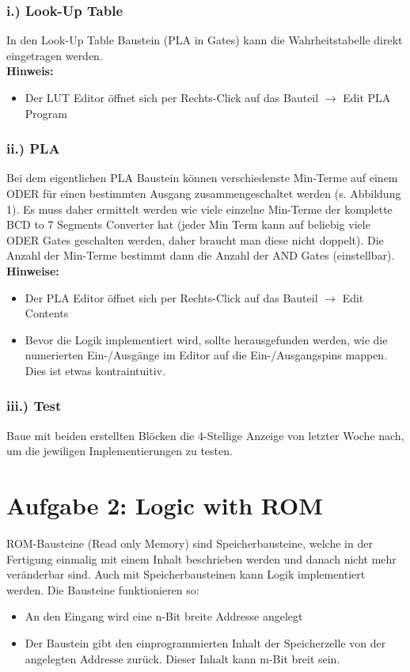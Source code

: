 \documentclass[a4paper]{scrartcl}
\begin{document}
\subsubsection*{i.) Look-Up Table}
In den Look-Up Table Baustein (PLA in Gates)  kann die Wahrheitstabelle direkt eingetragen werden.\\

\textbf{Hinweis:}
\begin{itemize}
  \item Der LUT Editor öffnet sich per Rechts-Click auf das Bauteil $\rightarrow$ Edit PLA Program
\end{itemize}

\subsubsection*{ii.) PLA}
Bei dem eigentlichen PLA Baustein können verschiedenste Min-Terme auf einem ODER für einen bestimmten Ausgang zusammengeschaltet werden (s. Abbildung 1).
Es muss daher ermittelt werden wie viele einzelne Min-Terme der komplette BCD to 7 Segments Converter hat (jeder Min Term kann auf beliebig viele
ODER Gates geschalten werden, daher braucht man diese nicht doppelt). Die Anzahl der Min-Terme bestimmt dann die Anzahl der AND Gates (einstellbar).\\


\textbf{Hinweise:}
\begin{itemize}
  \item Der PLA Editor öffnet sich per Rechts-Click auf das Bauteil $\rightarrow$ Edit Contents
  \item Bevor die Logik implementiert wird, sollte herausgefunden werden, wie die numerierten Ein-/Ausgänge im Editor auf die Ein-/Ausgangspins mappen. Dies ist etwas kontraintuitiv.
\end{itemize}

\subsubsection*{iii.) Test}
Baue mit beiden erstellten Blöcken die 4-Stellige Anzeige von letzter Woche nach, um die jewiligen Implementierungen zu testen.

\section*{Aufgabe 2: Logic with ROM}
ROM-Bausteine (Read only Memory) sind Speicherbausteine, welche in der Fertigung einmalig mit einem Inhalt beschrieben werden und danach nicht mehr veränderbar sind.
Auch mit Speicherbausteinen kann Logik implementiert werden. Die Bausteine funktionieren so:
\begin{itemize}
  \item An den Eingang wird eine n-Bit breite Addresse angelegt
  \item Der Baustein gibt den einprogrammierten Inhalt der Speicherzelle von der angelegten Addresse zurück. Dieser Inhalt kann m-Bit breit sein.
\end{itemize}
\end{document}
